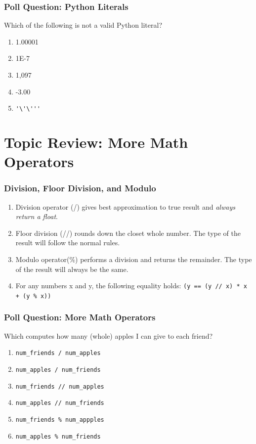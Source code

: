 \documentclass{beamer}
\begin{document}
%
%
%
\begin{frame}[fragile]
  \frametitle{Poll Question: Python Literals}
  Which of the following is not a valid Python literal?
  \begin{enumerate}
    \item 1.00001
    \item 1E-7
    \item 1,097
    \item -3.00
    \item \lstinline{'\'\'''}
  \end{enumerate}
\end{frame}


\section{Topic Review: More Math Operators}

%
%
%
\begin{frame}[fragile]
  \frametitle{Division, Floor Division, and Modulo}
  \begin{enumerate}
    \item Division operator (/) gives best approximation to true result and \textit{always return a float}.
    \item Floor division (//) rounds down the closet whole number. The type of the result will follow the normal rules.
    \item Modulo operator(\%) performs a division and returns the remainder. The type of the result will always be the same.
    \item For any numbers x and y, the following equality holds: \lstinline{(y == (y // x) * x + (y % x))}
  \end{enumerate}
\end{frame}

%
%
%
\begin{frame}[fragile]
  \frametitle{Poll Question: More Math Operators}
  \vfill
  Which computes how many (whole) apples I can give to each friend?
  \begin{enumerate}
    \item \lstinline{num_friends / num_apples}
    \item \lstinline{num_apples / num_friends}
    \item \lstinline{num_friends // num_apples}
    \item \lstinline{num_apples // num_friends}
    \item \lstinline{num_friends % num_appples}
    \item \lstinline{num_apples % num_friends}
  \end{enumerate}
\end{frame}
\end{document}
